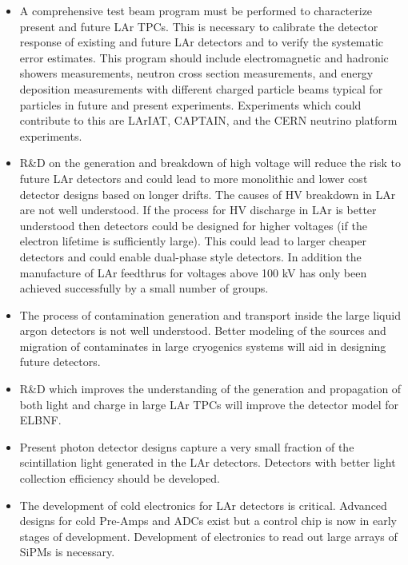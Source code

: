 \begin{itemize}

\item  A comprehensive test beam program must be performed to characterize present and future LAr TPCs. This is necessary to calibrate the detector response of existing and future LAr detectors and to verify the systematic error estimates. This program should include electromagnetic and hadronic showers measurements, neutron cross section measurements, and energy deposition measurements with different charged particle beams typical for particles in future and present experiments. Experiments which could contribute to this are LArIAT, CAPTAIN, and the CERN neutrino platform experiments.

\item  R\&D on the generation and breakdown of high voltage will reduce the risk to future LAr detectors and could lead to more monolithic and lower cost detector designs based on longer drifts. The causes of HV breakdown in LAr are not well understood. If the process for HV discharge in LAr is better understood then detectors could be designed for higher voltages (if the electron lifetime is sufficiently large). This could lead to larger cheaper detectors and could enable dual-phase style detectors.  In addition the manufacture of LAr feedthrus for voltages above 100 kV has only been achieved successfully by a small number of groups.    

\item The process of contamination generation and transport inside the large liquid argon detectors is not well understood. Better modeling of the sources and migration of contaminates in large cryogenics systems will aid in designing future detectors.

\item  R\&D which improves the understanding of the generation and propagation of both light and charge in large LAr TPCs will improve the detector model for ELBNF.
 
\item Present photon detector designs capture a very small fraction of the scintillation light generated in the LAr detectors. Detectors with better light collection efficiency should be developed. 

\item The development of cold electronics for LAr detectors is critical. Advanced designs for cold Pre-Amps and ADCs exist but a control chip is now in early stages of development. Development of electronics to read out large arrays of SiPMs is necessary.

\end{itemize}




